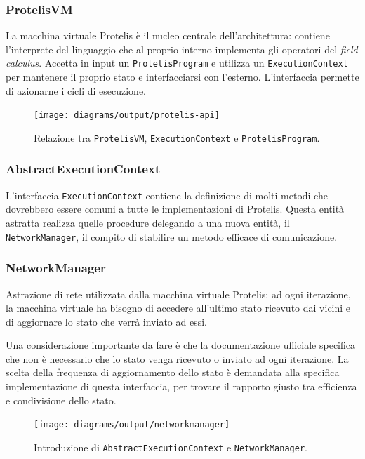 \subsubsection{ProtelisVM}
La macchina virtuale Protelis è il nucleo centrale dell'architettura: contiene
l'interprete del linguaggio che al proprio interno implementa gli operatori del
\textit{field calculus}. Accetta in input un \texttt{ProtelisProgram} e utilizza un
\texttt{ExecutionContext} per mantenere il proprio stato e interfacciarsi con
l'esterno. L'interfaccia permette di azionarne i cicli di esecuzione.

\begin{figure}
  \centering
  \texttt{[image: diagrams/output/protelis-api]}
  \caption{Relazione tra \texttt{ProtelisVM}, \texttt{ExecutionContext} e
      \texttt{ProtelisProgram}.}
  \label{fig:uml-protelisvm}
\end{figure}

\subsubsection{AbstractExecutionContext}
L'interfaccia \texttt{ExecutionContext} contiene la definizione di molti metodi
che dovrebbero essere comuni a tutte le implementazioni di Protelis. Questa
entità astratta realizza quelle procedure delegando a una nuova entità, il
\texttt{NetworkManager}, il compito di stabilire un metodo efficace di
comunicazione.

\subsubsection{NetworkManager}
Astrazione di rete utilizzata dalla macchina virtuale Protelis: ad ogni
iterazione, la macchina virtuale ha bisogno di accedere all'ultimo stato ricevuto
dai vicini e di aggiornare lo stato che verrà inviato ad essi.

Una considerazione importante da fare è che la documentazione ufficiale
specifica che non è necessario che lo stato venga ricevuto o inviato ad ogni
iterazione. La scelta della frequenza di aggiornamento dello stato è demandata
alla specifica implementazione di questa interfaccia, per trovare il rapporto
giusto tra efficienza e condivisione dello stato.

\begin{figure}
  \centering
  \texttt{[image: diagrams/output/networkmanager]}
    \caption{Introduzione di \texttt{AbstractExecutionContext} e \texttt{NetworkManager}.}
  \label{fig:uml-networkmanager}
\end{figure}

